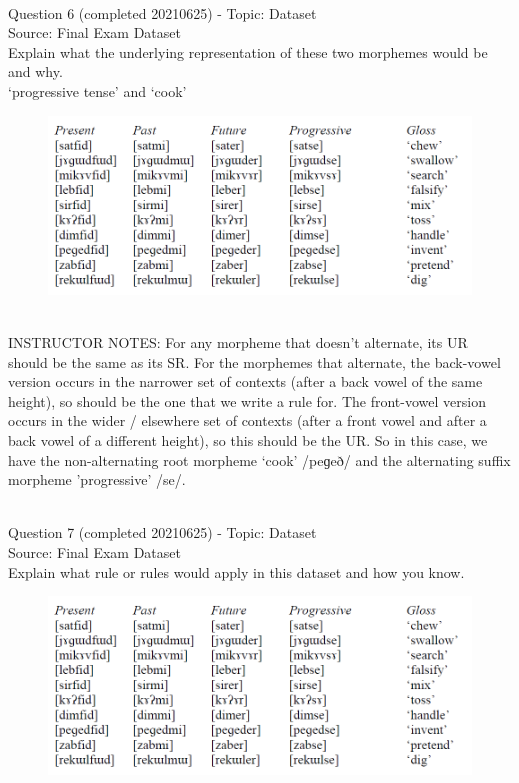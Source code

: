 \documentclass[12pt]{article}
\begin{document}
~\\

{\large Question 6} (completed 20210625) - Topic: Dataset\\
Source: Final Exam Dataset\\

Explain what the underlying representation of these two morphemes would be and why.\\

`progressive tense' and `cook' 

\begin{figure}[H]
\includegraphics{../images/final_dataset.png}
\end{figure}

~\\
INSTRUCTOR NOTES: For any morpheme that doesn’t alternate, its UR should be the same as its SR.  For the morphemes that alternate, the back-vowel version occurs in the narrower set of contexts (after a back vowel of the same height), so should be the one that we write a rule for. The front-vowel version occurs in the wider / elsewhere set of contexts (after a front vowel and after a back vowel of a different height), so this should be the UR. So in this case, we have the non-alternating root morpheme ‘cook’ /peɡeð/ and the alternating suffix morpheme 'progressive' /se/.


~\\

{\large Question 7} (completed 20210625) - Topic: Dataset\\
Source: Final Exam Dataset\\

Explain what rule or rules would apply in this dataset and how you know.\\

\begin{figure}[H]
\includegraphics{../images/final_dataset.png}
\end{figure}
\end{document}
